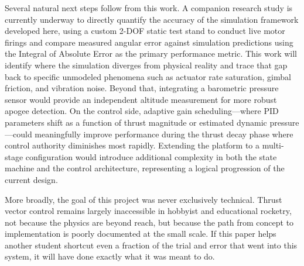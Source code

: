 Several natural next steps follow from this work. A companion research study is currently underway
to directly quantify the accuracy of the simulation framework developed here, using a custom 2-DOF
static test stand to conduct live motor firings and compare measured angular error against
simulation predictions using the Integral of Absolute Error as the primary performance metric.
This work will identify where the simulation diverges from physical reality and trace that gap back
to specific unmodeled phenomena such as actuator rate saturation, gimbal friction, and vibration
noise. Beyond that, integrating a barometric pressure sensor would provide an independent altitude
measurement for more robust apogee detection. On the control side, adaptive gain scheduling---where
PID parameters shift as a function of thrust magnitude or estimated dynamic pressure---could
meaningfully improve performance during the thrust decay phase where control authority diminishes
most rapidly. Extending the platform to a multi-stage configuration would introduce additional
complexity in both the state machine and the control architecture, representing a logical
progression of the current design.

More broadly, the goal of this project was never exclusively technical. Thrust vector control
remains largely inaccessible in hobbyist and educational rocketry, not because the physics are
beyond reach, but because the path from concept to implementation is poorly documented at the
small scale. If this paper helps another student shortcut even a fraction of the trial and error
that went into this system, it will have done exactly what it was meant to do.
